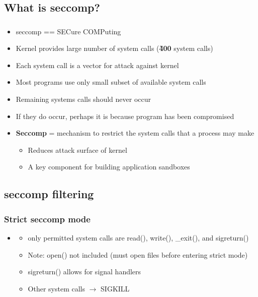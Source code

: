\documentclass[usenames,dvipsnames]{beamer}
\begin{document}
\subsection{What is seccomp?}
\begin{frame}
\frametitle{\subsecname}
\begin{itemize}
\item seccomp == SECure COMPuting
\item Kernel provides large number of system calls (\textbf{\~400} system calls)
\item Each system call is a vector for attack against kernel
\item Most programs use only small subset of available system calls
\item Remaining systems calls should never occur
\item If they do occur, perhaps it is because program has been compromised
\item \textbf{Seccomp} = mechanism to restrict the system calls that a process may make
  \begin{itemize}
  \item{Reduces attack surface of kernel}
  \item{A key component for building application sandboxes}
  \end{itemize}
\end{itemize}
\end{frame}

\subsection{seccomp filtering}
\begin{frame}
\frametitle{Strict seccomp mode}
\begin{itemize}
  \item 
  \begin{itemize}
    \item only permitted system calls are read(), write(), \_exit(), and sigreturn() 
    \item Note: open() not included (must open files before entering strict mode)
    \item sigreturn() allows for signal handlers
    \item Other system calls $\rightarrow$ SIGKILL
  \end{itemize}
\end{itemize}
\end{frame}
\end{document}
